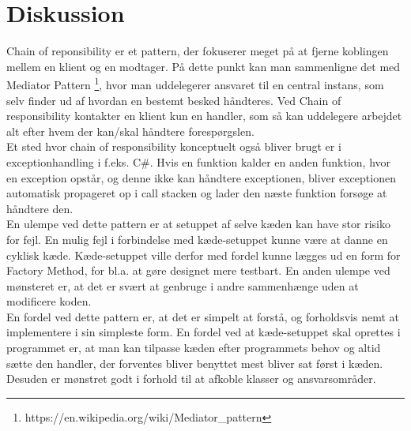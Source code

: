 \chapter{Diskussion}
Chain of reponsibility er et pattern, der fokuserer meget på at fjerne koblingen mellem en klient og en modtager. På dette punkt kan man sammenligne det med Mediator Pattern \footnote{https://en.wikipedia.org/wiki/Mediator\_pattern}, hvor man uddelegerer ansvaret til en central instans, som selv finder ud af hvordan en bestemt besked håndteres.
Ved Chain of responsibility kontakter en klient kun en handler, som så kan uddelegere arbejdet alt efter hvem der kan/skal håndtere forespørgslen. \\

\noindent Et sted hvor chain of responsibility konceptuelt også bliver brugt er i exceptionhandling i f.eks. C\#. Hvis en funktion kalder en anden funktion, hvor en exception opstår, og denne ikke kan håndtere exceptionen, bliver exceptionen automatisk propageret op i call stacken og lader den næste funktion forsøge at håndtere den. \\

\noindent En ulempe ved dette pattern er at setuppet af selve kæden kan have stor risiko for fejl. En mulig fejl i forbindelse med kæde-setuppet kunne være at danne en cyklisk kæde. Kæde-setuppet ville derfor med fordel kunne lægges ud en form for Factory Method, for bl.a. at gøre designet mere testbart. En anden ulempe ved mønsteret er, at det er svært at genbruge i andre sammenhænge uden at modificere koden. \\
\noindent En fordel ved dette pattern er, at det er simpelt at forstå, og forholdsvis nemt at implementere i sin simpleste form. En fordel ved at kæde-setuppet skal oprettes i programmet er, at man kan tilpasse kæden efter programmets behov og altid sætte den handler, der forventes bliver benyttet mest bliver sat først i kæden. 
Desuden er mønstret godt i forhold til at afkoble klasser og ansvarsområder.